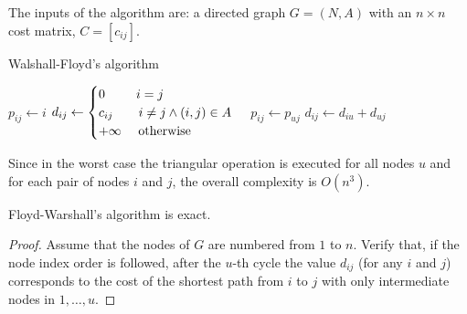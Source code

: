\documentclass[12pt, a4paper]{report}
\newtheorem[style=M,bodystyle=\normalfont]{proposition}{Proposition}
\newtheorem[style=M,bodystyle=\normalfont]{theorem}{Theorem}
\newtheorem[style=M,bodystyle=\normalfont]{corollary}{Corollary}
\newtheorem[style=M,bodystyle=\normalfont]{lemma}{Lemma}
\newtheorem[style=M,bodystyle=\normalfont]{definition}{Definition}
\begin{document}
    The inputs of the algorithm are: a directed graph $G = (N,A)$ with an $n \times n$ cost matrix, $C = [c_{ij}]$.
    \begin{algorithm}[H]
        \caption{Walshall-Floyd's algorithm}
            \begin{algorithmic}[1]
                        \State $p_{ij} \leftarrow i$
                        \State $d_{ij} \leftarrow \begin{cases}
                            0 \:\:\:\:\:\:\:\:\:\:\: i = j \\
                            c_{ij} \:\:\:\:\:\:\:\:\: i \neq j \land (i,j) \in A \\
                            +\infty \:\:\:\:\:\: \textnormal{otherwise}
                        \end{cases}$
                    \EndFor
                \EndFor
                                \State $p_{ij} \leftarrow p_{uj}$
                                \State $d_{ij} \leftarrow d_{iu}+d_{uj}$
                            \EndIf
                        \EndFor
                    \EndFor
                            \State \Return
                        \EndIf
                    \EndFor
                \EndFor
            \end{algorithmic}
    \end{algorithm}
    Since in the worst case the triangular operation is executed for all nodes $u$ and for each pair of nodes $i$ and $j$, the overall complexity is $O(n^3)$. 
    \begin{example}[Proposition]
        Floyd-Warshall's algorithm is exact. 
    \end{example}
    \begin{proof}
        Assume that the nodes of $G$ are numbered from $1$ to $n$. Verify that, if the node index order is followed, after the $u$-th cycle the value $d_{ij}$ (for any $i$ and $j$) corresponds to the cost of 
        the shortest path from $i$ to $j$ with only intermediate nodes in ${1,\dots,u}$. 
    \end{proof}
\end{document}
